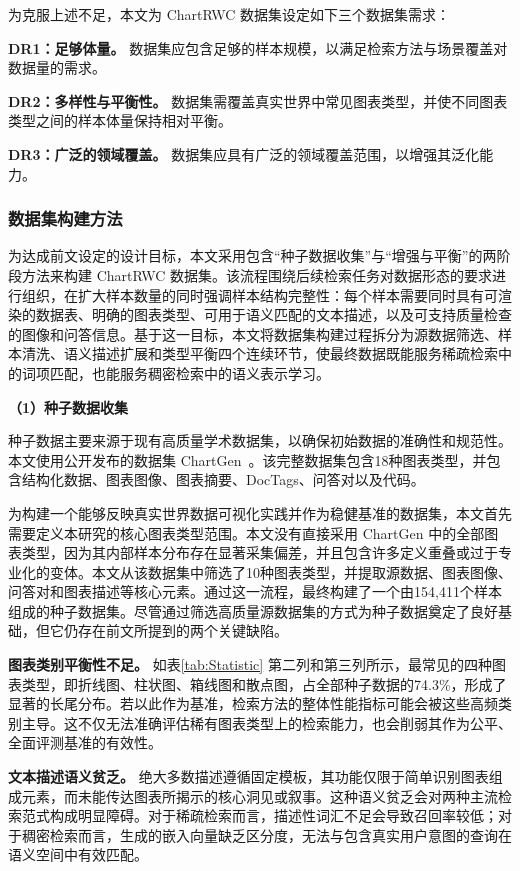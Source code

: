 为克服上述不足，本文为 ChartRWC 数据集设定如下三个数据集需求：

 \textbf{DR1：足够体量。} 数据集应包含足够的样本规模，以满足检索方法与场景覆盖对数据量的需求。

 \textbf{DR2：多样性与平衡性。} 数据集需覆盖真实世界中常见图表类型，并使不同图表类型之间的样本体量保持相对平衡。

 \textbf{DR3：广泛的领域覆盖。} 数据集应具有广泛的领域覆盖范围，以增强其泛化能力。

\subsubsection{数据集构建方法}

为达成前文设定的设计目标，本文采用包含“种子数据收集”与“增强与平衡”的两阶段方法来构建 ChartRWC 数据集。该流程围绕后续检索任务对数据形态的要求进行组织，在扩大样本数量的同时强调样本结构完整性：每个样本需要同时具有可渲染的数据表、明确的图表类型、可用于语义匹配的文本描述，以及可支持质量检查的图像和问答信息。基于这一目标，本文将数据集构建过程拆分为源数据筛选、样本清洗、语义描述扩展和类型平衡四个连续环节，使最终数据既能服务稀疏检索中的词项匹配，也能服务稠密检索中的语义表示学习。

\noindent\textbf{（1）种子数据收集}

种子数据主要来源于现有高质量学术数据集，以确保初始数据的准确性和规范性。本文使用公开发布的数据集 ChartGen~\cite{kondic2025chartgen}。该完整数据集包含18种图表类型，并包含结构化数据、图表图像、图表摘要、DocTags、问答对以及代码。

为构建一个能够反映真实世界数据可视化实践并作为稳健基准的数据集，本文首先需要定义本研究的核心图表类型范围。本文没有直接采用 ChartGen 中的全部图表类型，因为其内部样本分布存在显著采集偏差，并且包含许多定义重叠或过于专业化的变体。本文从该数据集中筛选了10种图表类型，并提取源数据、图表图像、问答对和图表描述等核心元素。通过这一流程，最终构建了一个由154,411个样本组成的种子数据集。尽管通过筛选高质量源数据集的方式为种子数据奠定了良好基础，但它仍存在前文所提到的两个关键缺陷。

\textbf{图表类别平衡性不足。}
如表\ref{tab:Statistic} 第二列和第三列所示，最常见的四种图表类型，即折线图、柱状图、箱线图和散点图，占全部种子数据的74.3\%，形成了显著的长尾分布。若以此作为基准，检索方法的整体性能指标可能会被这些高频类别主导。这不仅无法准确评估稀有图表类型上的检索能力，也会削弱其作为公平、全面评测基准的有效性。

\textbf{文本描述语义贫乏。}
绝大多数描述遵循固定模板，其功能仅限于简单识别图表组成元素，而未能传达图表所揭示的核心洞见或叙事。这种语义贫乏会对两种主流检索范式构成明显障碍。对于稀疏检索而言，描述性词汇不足会导致召回率较低；对于稠密检索而言，生成的嵌入向量缺乏区分度，无法与包含真实用户意图的查询在语义空间中有效匹配。

